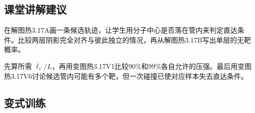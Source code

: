 \documentclass[UTF8,fontset=fandol,a4paper,11pt]{ctexart}
\begin{document}


\subsection*{课堂讲解建议}

在解图热3.17A画一条候选轨迹，让学生用分子中心是否落在管内来判定直达条件。比较两层阴影完全对齐与彼此独立的情况，再从解图热3.17B写出单层的无靶概率。

先算所需 $\bar\ell_e/L$，再用变图热3.17V1比较90\%和99\%各自允许的压强。最后用变图热3.17V6讨论候选管内可能有多个靶，但一次碰撞已使对应样本失去直达条件。



\subsection*{变式训练}
\end{document}
